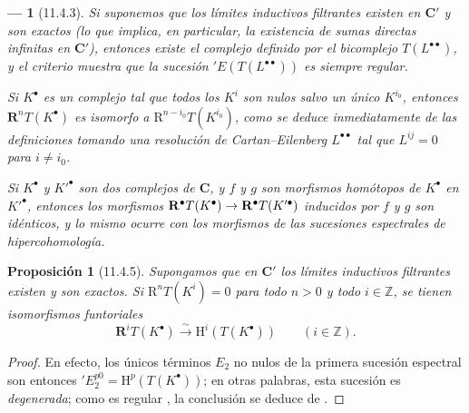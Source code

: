 \documentclass[10pt,oneside,openany]{book}
\theoremstyle{egaenv}\newtheorem*{env}{---}
\theoremstyle{egastatement}
\newtheorem*{proposition}{Proposición}
\theoremstyle{egadescription}
\renewcommand{\to}{\mathchoice{\longrightarrow}{\rightarrow}{\rightarrow}{\rightarrow}}
\begin{document}
\begin{env}[11.4.3]
Si suponemos que los límites inductivos filtrantes existen en $\boldsymbol{C}'$ y son exactos (lo que implica, en particular, la existencia de sumas directas infinitas en $\boldsymbol{C}'$), entonces existe el complejo definido por el bicomplejo $T(L^{\bullet\bullet})$, y el criterio  muestra que la sucesión $'E(T(L^{\bullet\bullet}))$ es siempre \emph{regular}.

Si $K^\bullet$ es un complejo tal que todos los $K^i$ son nulos salvo un único $K^{i_0}$, entonces
$\mathbf R^nT(K^\bullet)$ es isomorfo a $\mathrm R^{n-i_0}T(K^{i_0})$, como se deduce inmediatamente de las definiciones tomando una resolución de Cartan--Eilenberg $L^{\bullet\bullet}$ tal que $L^{ij}=0$ para $i\neq i_0$.

Si $K^\bullet$ y $K'^\bullet$ son dos complejos de $\boldsymbol{C}$, y $f$ y $g$ son morfismos homótopos de $K^\bullet$ en $K'^\bullet$, entonces los morfismos $\mathbf R^\bullet T(K^\bullet)\to
\mathbf R^\bullet T(K'^\bullet)$ inducidos por $f$ y $g$ son idénticos, y lo mismo ocurre con los morfismos de las sucesiones espectrales de hipercohomología.
\end{env}

\begin{proposition}[11.4.5]
\label{0.11.4.5-fr}
Supongamos que en $\boldsymbol{C}'$ los límites inductivos filtrantes existen y son exactos. Si $\mathrm R^nT(K^i)=0$ para todo $n>0$ y todo $i\in\mathbb Z$, se tienen isomorfismos funtoriales
\[
  \label{0.11.4.5.1-fr}
  \mathbf R^iT(K^\bullet)\xrightarrow{\sim}
  \mathrm H^i(T(K^\bullet))\qquad(i\in\mathbb Z).
  \tag{11.4.5.1}
\]
\end{proposition}

\begin{proof}
En efecto, los únicos términos $E_2$ no nulos de la primera sucesión espectral  son entonces $'E_2^{p0}=\mathrm H^p(T(K^\bullet))$;
en otras palabras, esta sucesión es \emph{degenerada};
como es regular , la conclusión se deduce de .
\end{proof}
\end{document}
